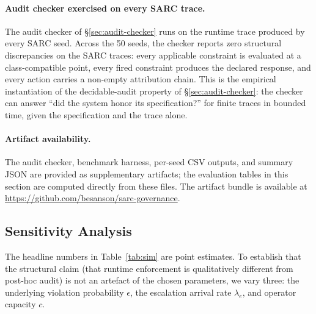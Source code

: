 \documentclass[11pt,a4paper]{article}
\theoremstyle{remark}
\begin{document}
\paragraph{Audit checker exercised on every SARC trace.} The audit checker of \S\ref{sec:audit-checker} runs on the runtime trace produced by every SARC seed. Across the 50 seeds, the checker reports zero structural discrepancies on the SARC traces: every applicable constraint is evaluated at a class-compatible point, every fired constraint produces the declared response, and every action carries a non-empty attribution chain. This is the empirical instantiation of the decidable-audit property of \S\ref{sec:audit-checker}: the checker can answer ``did the system honor its specification?'' for finite traces in bounded time, given the specification and the trace alone.

\paragraph{Artifact availability.} The audit checker, benchmark harness, per-seed CSV outputs, and summary JSON are provided as supplementary artifacts; the evaluation tables in this section are computed directly from these files. The artifact bundle is available at \url{https://github.com/besanson/sarc-governance}.

\subsection{Sensitivity Analysis}\label{sec:sensitivity}

The headline numbers in Table~\ref{tab:sim} are point estimates. To establish that the structural claim (that runtime enforcement is qualitatively different from post-hoc audit) is not an artefact of the chosen parameters, we vary three: the underlying violation probability $\epsilon$, the escalation arrival rate $\lambda_e$, and operator capacity $c$.
\end{document}
